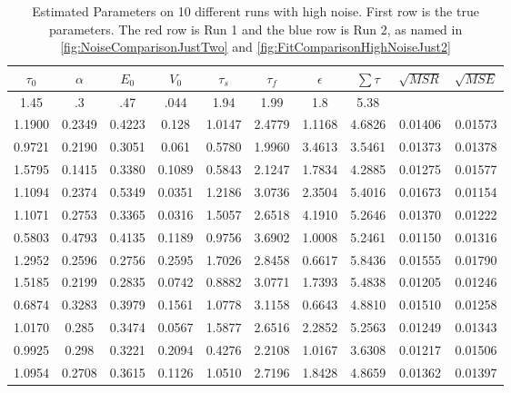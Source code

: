 \begin{table}[t]
\centering
\begin{tabular}{|c | c | c | c | c | c | c | c | c | c |}
\hline 
$\tau_0$ & $\alpha$ & $E_0$    & $V_0$    & $\tau_s$ & $\tau_f$ & $\epsilon$  & $ \sum \tau $ & $\sqrt{MSR}$  & $\sqrt{MSE}$\\
\hline 
\rowcolor[gray]{.8}
1.45 & .3 & .47 & .044 & 1.94 & 1.99 & 1.8  & 5.38 &  & \\
\hline 
\hline 
1.1900 & 0.2349 & 0.4223 & 0.128  & 1.0147 & 2.4779 & 1.1168 & 4.6826 &0.01406 &0.01573   \\
0.9721 & 0.2190 & 0.3051 & 0.061  & 0.5780 & 1.9960 & 3.4613 & 3.5461 &0.01373 &0.01378   \\
1.5795 & 0.1415 & 0.3380 & 0.1089 & 0.5843 & 2.1247 & 1.7834 & 4.2885 &0.01275 &0.01577   \\
1.1094 & 0.2374 & 0.5349 & 0.0351 & 1.2186 & 3.0736 & 2.3504 & 5.4016 &0.01673 &0.01154    \\
1.1071 & 0.2753 & 0.3365 & 0.0316 & 1.5057 & 2.6518 & 4.1910 & 5.2646 &0.01370 &0.01222   \\
0.5803 & 0.4793 & 0.4135 & 0.1189 & 0.9756 & 3.6902 & 1.0008 & 5.2461 &0.01150 &0.01316   \\
\rowcolor[rgb]{.9,.5,.5}
1.2952 & 0.2596 & 0.2756 & 0.2595 & 1.7026 & 2.8458 & 0.6617 & 5.8436 &0.01555 &0.01790   \\
\rowcolor[rgb]{.5,.5,.9}
1.5185 & 0.2199 & 0.2835 & 0.0742 & 0.8882 & 3.0771 & 1.7393 & 5.4838 &0.01205 &0.01246   \\
0.6874 & 0.3283 & 0.3979 & 0.1561 & 1.0778 & 3.1158 & 0.6643 & 4.8810 &0.01510 &0.01258   \\
1.0170 & 0.285  & 0.3474 & 0.0567 & 1.5877 & 2.6516 & 2.2852 & 5.2563 &0.01249 &0.01343   \\
0.9925 & 0.298  & 0.3221 & 0.2094 & 0.4276 & 2.2108 & 1.0167 & 3.6308 &0.01217 &0.01506   \\
\hline                                                                          
1.0954 & 0.2708 & 0.3615 & 0.1126 & 1.0510 & 2.7196 & 1.8428 & 4.8659 &0.01362 &0.01397\\
\hline 
\end{tabular}
\caption{Estimated Parameters on 10 different runs with high noise. First row is the true parameters.
The red row is Run 1 and the blue row is Run 2, as named in  \autoref{fig:NoiseComparisonJustTwo}
and \autoref{fig:FitComparisonHighNoiseJust2}}
\label{tab:HighNoiseResults} 
\end{table}


